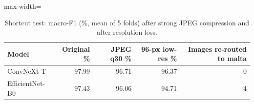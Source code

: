 \begin{table}[!htbp]
\centering
\scriptsize
\caption{Shortcut test: macro-F1 (\%, mean of 5 folds) after strong JPEG compression and after resolution loss.}
\label{tab:s_shortcut}
\begin{adjustbox}{max width=\textwidth}
\begin{tabular}{@{}lrrrr@{}}
\toprule
Model & Original \% & JPEG q30 \% & 96-px low-res \% & Images re-routed to malta \\
\midrule
ConvNeXt-T & 97.99 & 96.71 & 96.37 & 0 \\
EfficientNet-B0 & 97.43 & 96.06 & 94.71 & 4 \\
\bottomrule
\end{tabular}
\end{adjustbox}
\end{table}

